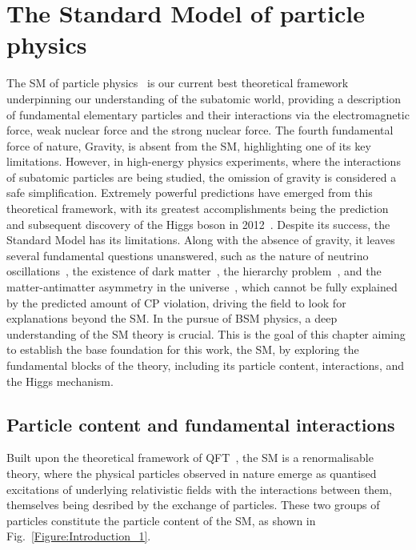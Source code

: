 \chapter{The Standard Model of particle physics}
\thispagestyle{plain}  %
\pagestyle{chapterpages}
The \ac{SM} of particle physics~\cite{Glashow_StandardModel_1,Weinberg_StandardModel_1,StandardModel_3,Standard_Model4,StandardModel_3} is our current best theoretical framework underpinning our understanding of the subatomic world, providing a description of fundamental elementary particles and their interactions via the electromagnetic force, weak nuclear force and the strong nuclear force. The fourth fundamental force of nature, Gravity, is absent from the SM, highlighting one of its key limitations. However, in high-energy physics experiments, where the interactions of subatomic particles are being studied, the omission of gravity is considered a safe simplification. Extremely powerful predictions have emerged from this theoretical framework, with its greatest accomplishments being the prediction~\cite{Higgs_1} and subsequent discovery of the Higgs boson in 2012~\cite{Higgs_ATLAS,Higgs_CMS}. Despite its success, the Standard Model has its limitations. Along with the absence of gravity, it leaves several fundamental questions unanswered, such as the nature of neutrino oscillations~\cite{Neutrino_Oscillations}, the existence of dark matter~\cite{DarkMatter}, the hierarchy problem~\cite{HierarchyProblem}, and the matter-antimatter asymmetry in the universe~\cite{MatterAntimatter}, which cannot be fully explained by the predicted amount of CP violation, driving the field to look for explanations beyond the SM. In the pursue of \ac{BSM} physics, a deep understanding of the SM theory is crucial. This is the goal of this chapter aiming to establish the base foundation for this work, the SM, by exploring the fundamental blocks of the theory, including its particle content, interactions, and the Higgs mechanism.

\section{Particle content and fundamental interactions}

Built upon the theoretical framework of \ac{QFT}~\cite{QFT}, the SM is a renormalisable theory, where the physical particles observed in nature emerge as quantised excitations of underlying relativistic fields with the interactions between them, themselves being desribed by the exchange of particles. These two groups of particles constitute the particle content of the SM, as shown in Fig.~\ref{Figure:Introduction_1}.


